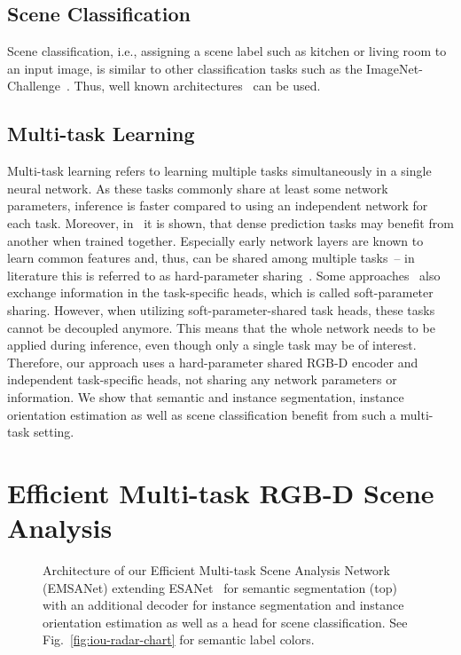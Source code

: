 \documentclass[conference]{IEEEtran}
\begin{document}
\subsection{Scene Classification}
\label{sec:related_work:scene_classification}
Scene classification, i.e., assigning a scene label such as kitchen or living room to an input image, is similar to other classification tasks such as the ImageNet-Challenge~\cite{ImageNet-ijcv2015}.
Thus, well known architectures~\cite{ResNet-cvpr2016, SENet-cvpr2018, MobileNetv2-cvpr2018, EfficientNet-icml2019} can be used.


\subsection{Multi-task Learning}
\label{sec:related_work:multitask}
Multi-task learning refers to learning multiple tasks simultaneously in a single neural network.
As these tasks commonly share at least some network parameters, inference is faster compared to using an independent network for each task.
Moreover, in~\cite{MTL-which-tasks-together-icml2020} it is shown, that dense prediction tasks may benefit from another when trained together. 
Especially early network layers are known to learn common features and, thus, can be shared among multiple tasks~-- in literature this is referred to as hard-parameter sharing~\cite{MTL-survey-tpami-2021}.
Some approaches~\cite{MTINet-eccv2020, JTRL-eccv2018} also exchange information in the task-specific heads, which is called soft-parameter sharing.
However, when utilizing soft-parameter-shared task heads, these tasks cannot be decoupled anymore.
This means that the whole network needs to be applied during inference, even though only a single task may be of interest.
Therefore, our approach uses a hard-parameter shared \mbox{RGB-D} encoder and independent task-specific heads, not sharing any network parameters or information.
We show that semantic and instance segmentation, instance orientation estimation as well as scene classification benefit from such a multi-task setting.
 \section{Efficient Multi-task RGB-D Scene Analysis}
\label{sec:main}

\begin{figure*}[!t]
    \centering \vspace{1mm}\vspace{-1mm}\caption{Architecture of our Efficient Multi-task Scene Analysis Network (EMSANet) extending ESANet~\cite{esanet2021icra} for semantic segmentation (top) with an additional decoder for instance segmentation and instance orientation estimation as well as a head for scene classification. See Fig.~\ref{fig:iou-radar-chart} for semantic label colors.}\label{fig:architecture}\vspace{-4mm}\end{figure*}
\end{document}
